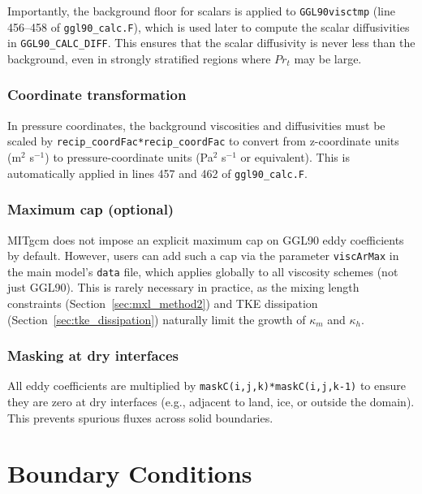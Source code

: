 \documentclass[12pt,letterpaper]{article}
\begin{document}
Importantly, the background floor for scalars is applied to \verb|GGL90visctmp| (line 456--458 of \verb|ggl90_calc.F|), which is used later to compute the scalar diffusivities in \verb|GGL90_CALC_DIFF|. This ensures that the scalar diffusivity is never less than the background, even in strongly stratified regions where $Pr_t$ may be large.

\subsubsection{Coordinate transformation}

In pressure coordinates, the background viscosities and diffusivities must be scaled by \verb|recip_coordFac*recip_coordFac| to convert from z-coordinate units (m$^2$ s$^{-1}$) to pressure-coordinate units (Pa$^2$ s$^{-1}$ or equivalent). This is automatically applied in lines 457 and 462 of \verb|ggl90_calc.F|.

\subsubsection{Maximum cap (optional)}

MITgcm does not impose an explicit maximum cap on GGL90 eddy coefficients by default. However, users can add such a cap via the parameter \verb|viscArMax| in the main model's \verb|data| file, which applies globally to all viscosity schemes (not just GGL90). This is rarely necessary in practice, as the mixing length constraints (Section~\ref{sec:mxl_method2}) and TKE dissipation (Section~\ref{sec:tke_dissipation}) naturally limit the growth of $\kappa_m$ and $\kappa_h$.

\subsubsection{Masking at dry interfaces}

All eddy coefficients are multiplied by \verb|maskC(i,j,k)*maskC(i,j,k-1)| to ensure they are zero at dry interfaces (e.g., adjacent to land, ice, or outside the domain). This prevents spurious fluxes across solid boundaries.

\section{Boundary Conditions}
\label{sec:boundary_conditions}
\end{document}
